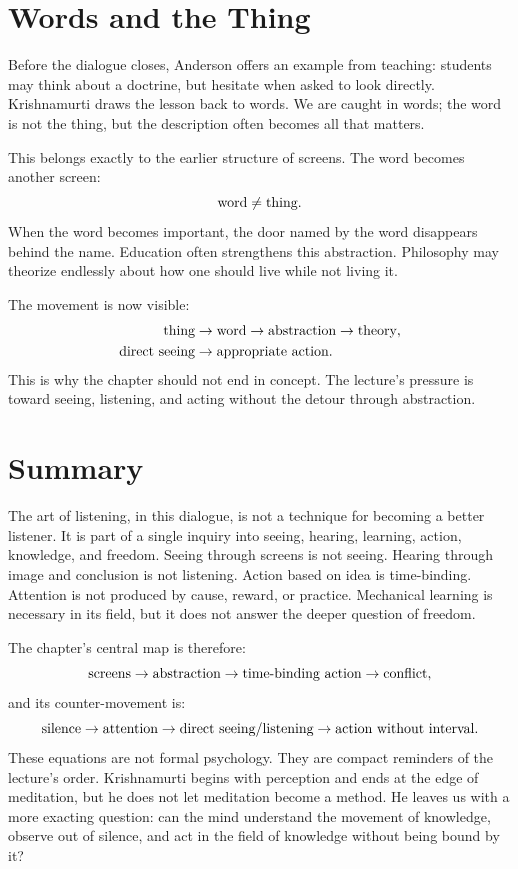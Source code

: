\section{Words and the Thing}

Before the dialogue closes, Anderson offers an example from teaching: students may think about a doctrine, but hesitate when asked to look directly. Krishnamurti draws the lesson back to words. We are caught in words; the word is not the thing, but the description often becomes all that matters.

This belongs exactly to the earlier structure of screens. The word becomes another screen:
\begin{equation}
\hbox{word} \neq \hbox{thing}.
\end{equation}
When the word becomes important, the door named by the word disappears behind the name. Education often strengthens this abstraction. Philosophy may theorize endlessly about how one should live while not living it.

The movement is now visible:
\begin{align}
\hbox{thing}
&\to
\hbox{word}
\to
\hbox{abstraction}
\to
\hbox{theory},\\
\hbox{direct seeing}
&\to
\hbox{appropriate action}.
\end{align}
This is why the chapter should not end in concept. The lecture's pressure is toward seeing, listening, and acting without the detour through abstraction.

\section{Summary}

The art of listening, in this dialogue, is not a technique for becoming a better listener. It is part of a single inquiry into seeing, hearing, learning, action, knowledge, and freedom. Seeing through screens is not seeing. Hearing through image and conclusion is not listening. Action based on idea is time-binding. Attention is not produced by cause, reward, or practice. Mechanical learning is necessary in its field, but it does not answer the deeper question of freedom.

The chapter's central map is therefore:
\begin{equation}
\hbox{screens}
\to
\hbox{abstraction}
\to
\hbox{time-binding action}
\to
\hbox{conflict},
\end{equation}
and its counter-movement is:
\begin{equation}
\hbox{silence}
\to
\hbox{attention}
\to
\hbox{direct seeing/listening}
\to
\hbox{action without interval}.
\end{equation}
These equations are not formal psychology. They are compact reminders of the lecture's order. Krishnamurti begins with perception and ends at the edge of meditation, but he does not let meditation become a method. He leaves us with a more exacting question: can the mind understand the movement of knowledge, observe out of silence, and act in the field of knowledge without being bound by it?